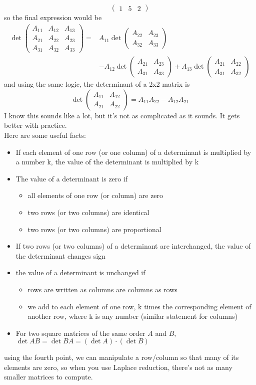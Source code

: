 \documentclass[oneside]{book}
\numberwithin{equation}{chapter} %
\begin{document}
$$
\begin{pmatrix}
	1&5&2
\end{pmatrix}
$$
so the final expression would be
\begin{align*}
	\det\begin{pmatrix}
		A_{11}&A_{12}&A_{13}\\A_{21}&A_{22}&A_{23}\\A_{31}&A_{32}&A_{33}
	\end{pmatrix}
	=&A_{11}\det\begin{pmatrix}
		A_{22}&A_{23}\\A_{32}&A_{33}
	\end{pmatrix}\\&-A_{12}\det\begin{pmatrix}
		A_{21}&A_{23}\\A_{31}&A_{33}
	\end{pmatrix}+A_{13}\det\begin{pmatrix}
		A_{21}&A_{22}\\A_{31}&A_{32}
	\end{pmatrix}
\end{align*}
and using the same logic, the determinant of a 2x2 matrix is 
$$\det\begin{pmatrix}
	A_{11}&A_{12}\\A_{21}&A_{22}
\end{pmatrix}=A_{11}A_{22}-A_{12}A_{21}$$
I know this sounds like a lot, but it's not as complicated as it sounds. It gets better with practice. \\

Here are some useful facts:
\begin{itemize}
	\item If each element of one row (or one column) of a determinant is multiplied by a number k, the value of the determinant is multiplied by k
	\item The value of a determinant is zero if 
	\begin{itemize}
		\item all elements of one row (or column) are zero
		\item two rows (or two columns) are identical
		\item two rows (or two columns) are proportional
	\end{itemize}
	\item If two rows (or two columns) of a determinant are interchanged, the value of the determinant changes sign
	\item the value of a determinant is unchanged if 
	\begin{itemize}
		\item rows are written as columns are columns as rows
		\item we add to each element of one row, k times the corresponding element of another row, where k is any number (similar statement for columns)
	\end{itemize}
	\item For two square matrices of the same order $A$ and $B$, $\det AB=\det BA=(\det A)\cdot(\det B)$
\end{itemize}
using the fourth point, we can manipulate a row/column so that many of its elements are zero, so when you use Laplace reduction, there's not as many smaller matrices to compute. 
\end{document}
